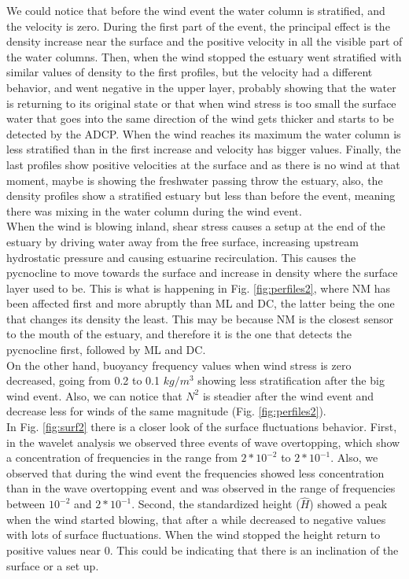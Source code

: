 \documentclass[tesis.tex]{subfiles}
\begin{document}
    We could notice that before the wind event the water column is stratified, and the velocity is zero. During the first part of the event, the principal effect is the density increase near the surface and the positive velocity in all the visible part of the water columns. Then, when the wind stopped the estuary went stratified with similar values of density to the first profiles, but the velocity had a different behavior, and went negative in the upper layer, probably showing that the water is returning to its original state or that when wind stress is too small the surface water that goes into the same direction of the wind gets thicker and starts to be detected by the ADCP. When the wind reaches its maximum the water column is less stratified than in the first increase and velocity has bigger values. Finally, the last profiles show positive velocities at the surface and as there is no wind at that moment, maybe is showing the freshwater passing throw the estuary, also, the density profiles show a stratified estuary but less than before the event, meaning there was mixing in the water column during the wind event.\\
    
    When the wind is blowing inland, shear stress causes a setup at the end of the estuary by driving water away from the free surface, increasing upstream hydrostatic pressure and causing estuarine recirculation. This causes the pycnocline to move towards the surface and increase in density where the surface layer used to be. This is what is happening in Fig. \ref{fig:perfiles2}, where NM has been affected first and more abruptly than ML and DC, the latter being the one that changes its density the least. This may be because NM is the closest sensor to the mouth of the estuary, and therefore it is the one that detects the pycnocline first, followed by ML and DC.\\
    
    On the other hand, buoyancy frequency values when wind stress is zero decreased, going from 0.2 to 0.1 $kg/m^3$  showing less stratification after the big wind event. Also, we can notice that $N^2$ is steadier after the wind event and decrease less for winds of the same magnitude (Fig. \ref{fig:perfiles2}).\\

    In Fig. \ref{fig:surf2} there is a closer look of the surface fluctuations behavior. First, in the wavelet analysis we observed three events of wave overtopping, which show a concentration of frequencies in the range from $2*10^{-2}$ to $2*10^{-1}$. Also, we observed that during the wind event the frequencies showed less concentration than in the wave overtopping event and was observed in the range of frequencies between $10^{-2}$ and $2*10^{-1}$. Second, the standardized height ($\hat{H}$) showed a peak when the wind started blowing, that after a while decreased to negative values with lots of surface fluctuations. When the wind stopped the height return to positive values near 0. This could be indicating that there is an inclination of the surface or a set up. \\
\end{document}
